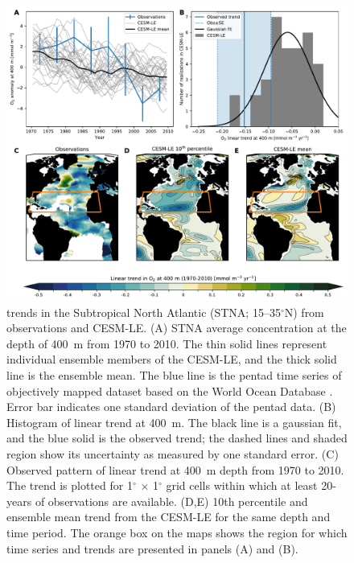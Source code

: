 \documentclass[draft,linenumbers]{report_chapter}
\begin{document}
\begin{figure}[tbp]
\centering
\includegraphics[width=1\textwidth]{obs-cesm-stna-trends.pdf}
\caption{ trends in the Subtropical North Atlantic (STNA; 15--35$^\circ$N) from observations and CESM-LE.
(A) STNA average  concentration at the depth of 400~m from 1970 to 2010.
The thin solid lines represent individual ensemble members of the CESM-LE, and the thick solid line is the ensemble mean.
The blue line is the pentad time series of objectively mapped  dataset based on the World Ocean Database \citep{Ito-Minobe-etal-2017}.
Error bar indicates one standard deviation of the pentad data.
(B) Histogram of linear  trend at 400~m.
The black line is a gaussian fit, and the blue solid is the observed trend; the dashed lines and shaded region show its uncertainty as measured by one standard error.
(C) Observed pattern of linear trend at 400~m depth from 1970 to 2010.
The trend is plotted for 1$^\circ$ $\times$ 1$^\circ$ grid cells within which at least 20-years of observations are available.
(D,E) 10th percentile and ensemble mean trend from the CESM-LE for the same depth and time period.
The orange box on the maps shows the region for which time series and trends are presented in panels (A) and (B).
}
\label{fig:test_trend_STNA}
\end{figure}
\end{document}
